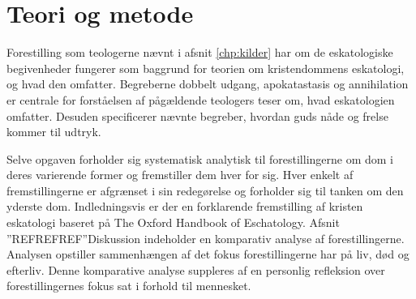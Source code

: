\chapter{Teori og metode}
Forestilling som teologerne nævnt i afsnit \ref{chp:kilder} har om de eskatologiske begivenheder fungerer som baggrund for teorien om kristendommens eskatologi, og hvad den omfatter. Begreberne dobbelt udgang, apokatastasis og annihilation er centrale for forståelsen af pågældende teologers teser om, hvad eskatologien omfatter. Desuden specificerer nævnte begreber, hvordan guds nåde og frelse kommer til udtryk.

Selve opgaven forholder sig systematisk analytisk til forestillingerne om dom i deres varierende former og fremstiller dem hver for sig. Hver enkelt af fremstillingerne er afgrænset i sin redegørelse og forholder sig til tanken om den yderste dom. Indledningsvis er der en forklarende fremstilling af kristen eskatologi baseret på The Oxford Handbook of Eschatology. Afsnit ”REFREFREF”Diskussion indeholder en komparativ analyse af forestillingerne. Analysen opstiller sammenhængen af det fokus forestillingerne har på liv, død og efterliv. Denne komparative analyse suppleres af en personlig refleksion over forestillingernes fokus sat i forhold til mennesket.